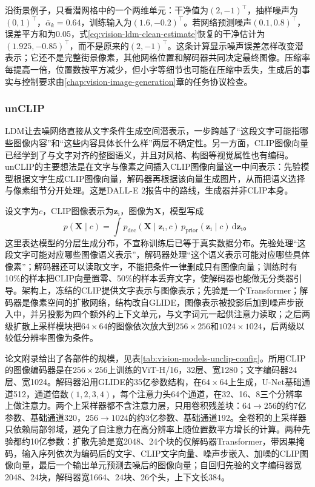 沿街景例子，只看潜网格中的一个两维单元：干净值为$(2,-1)^\top$，抽样噪声为$(0,1)^\top$，$\bar\alpha_k=0.64$，训练输入为$(1.6,-0.2)^\top$。若网络预测噪声$(0.1,0.8)^\top$，误差平方和为0.05，式\eqref{eq:vision-ldm-clean-estimate}恢复的干净估计为$(1.925,-0.85)^\top$，而不是原来的$(2,-1)^\top$。这条计算显示噪声误差怎样改变潜表示；它还不是完整街景像素，其他网格位置和解码器共同决定最终图像。压缩率每提高一倍，位置数按平方减少，但小字等细节也可能在压缩中丢失，生成后的事实与控制要求由\ref{chap:vision-image-generation}章的任务协议检查。

\subsubsection{unCLIP}
\label{sec:vision-models-unclip}

LDM让去噪网络直接从文字条件生成空间潜表示，一步跨越了“这段文字可能指哪些图像内容”和“这些内容具体长什么样”两层不确定性。另一方面，CLIP图像向量已经学到了与文字对齐的整图语义，并且对风格、构图等视觉属性也有编码。unCLIP的主要想法是在文字与像素之间插入CLIP图像向量这一中间表示：先验模型根据文字生成CLIP图像向量，解码器再根据该向量生成图片，从而把语义选择与像素细节分开处理。这是DALL-E 2报告中的路线，生成器并非CLIP本身。

设文字为$c$，CLIP图像表示为$\bm z_{\mathrm i}$，图像为$\bm X$，模型写成
\begin{equation}
  p(\bm X\mid c)
  =\int p_{\mathrm{dec}}(\bm X\mid\bm z_{\mathrm i},c)\,
          p_{\mathrm{prior}}(\bm z_{\mathrm i}\mid c)\,
          \mathrm d\bm z_{\mathrm i}\text{。}
  \label{eq:vision-unclip-factorization}
\end{equation}
这里表达模型的分层生成分布，不宣称训练后已等于真实数据分布。先验处理“这段文字可能对应哪些图像语义表示”，解码器处理“这个语义表示可能对应哪些具体像素”；解码器还可以读取文字，不能把条件一律删成只有图像向量；训练时有10\%的样本把CLIP向量置零、50\%的样本丢弃文字，使解码器也能做无分类器引导。架构上，冻结的CLIP提供文字表示与图像表示；先验是一个Transformer；解码器是像素空间的扩散网络，结构改自GLIDE，图像表示被投影后加到噪声步嵌入中，并另投影为四个额外的上下文单元，与文字词元一起供注意力读取；之后两级扩散上采样模块把$64\times64$的图像依次放大到$256\times256$和$1024\times1024$，后两级以较低分辨率图像为条件。

论文附录给出了各部件的规模，见表\ref{tab:vision-models-unclip-config}。所用CLIP的图像编码器是在$256\times256$上训练的ViT-H/16，32层、宽1280；文字编码器24层、宽1024。解码器沿用GLIDE的35亿参数结构，在$64\times64$上生成，U-Net基础通道512，通道倍数$(1,2,3,4)$，每个注意力头64个通道，在32、16、8三个分辨率上做注意力。两个上采样器都不含注意力层，只用卷积残差块：$64\to256$的约7亿参数、基础通道320，$256\to1024$的约3亿参数、基础通道192。全卷积的上采样器只依赖局部邻域，避免了自注意力在高分辨率上随位置数平方增长的计算。两种先验都约10亿参数：扩散先验是宽2048、24个块的仅解码器Transformer，带因果掩码，输入序列依次为编码后的文字、CLIP文字向量、噪声步嵌入、加噪的CLIP图像向量，最后一个输出单元预测去噪后的图像向量；自回归先验的文字编码器宽2048、24块，解码器宽1664、24块、26个头，上下文长384。

